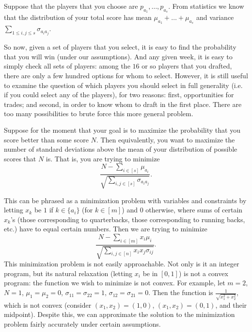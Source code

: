 \documentclass[12pt, final, onecolumn, titlepage]{article}
\theoremstyle{definition}
\begin{document}
Suppose that the players that you choose are $p_{a_1}, \dots, p_{a_s}$. From statistics we know that the distribution of your total score has mean $\mu_{a_1} + \dots + \mu_{a_s}$ and variance $\sum_{1 \le i, j \le s} \sigma_{a_ia_j}$.

So now, given a set of players that you select, it is easy to find the probability that you will win (under our assumptions). And any given week, it is easy to simply check all sets of players: among the $16$ or so players that you drafted, there are only a few hundred options for whom to select. However, it is still useful to examine the question of which players you should select in full generality (i.e. if you could select any of the players), for two reasons: first, opportunities for trades; and second, in order to know whom to draft in the first place. There are too many possibilities to brute force this more general problem.

Suppose for the moment that your goal is to maximize the probability that you score better than some score $N$. Then equivalently, you want to maximize the number of standard deviations above the mean of your distribution of possible scores that $N$ is. That is, you are trying to minimize
\[\frac{N - \sum_{i \in [s]} \mu_{a_i}}{\sqrt{\sum_{i, j \in [s]} \sigma_{a_ia_j}}}.\]

This can be phrased as a minimization problem with variables and constraints by letting $x_k$ be $1$ if $k \in \{a_i\}$ (for $k \in [m]$) and $0$ otherwise, where sums of certain $x_k$'s (those corresponding to quarterbacks, those corresponding to running backs, etc.) have to equal certain numbers. Then we are trying to minimize
\[\frac{N - \sum_{i \in [m]} x_i \mu_i}{\sqrt{\sum_{i, j \in [n]} x_i x_j \sigma_{ij}}}.\]
This minimization problem is not easily approachable. Not only is it an integer program, but its natural relaxation (letting $x_i$ be in $[0, 1]$) is not a convex program: the function we wish to minimize is not convex. For example, let $m = 2$, $N = 1$, $\mu_1 = \mu_2 = 0$, $\sigma_{11} = \sigma_{22} = 1$, $\sigma_{12} = \sigma_{21} = 0$. Then the function is $\frac{1}{\sqrt{x_1^2 + x_2^2}}$, which is not convex (consider $(x_1, x_2) = (1, 0)$, $(x_1, x_2) = (0, 1)$, and their midpoint). Despite this, we can approximate the solution to the minimization problem fairly accurately under certain assumptions.
\end{document}
